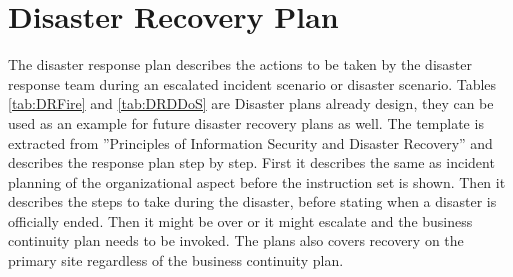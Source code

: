 \section{Disaster Recovery Plan}
The disaster response plan describes the actions to be taken by the disaster response team during an escalated incident scenario or disaster scenario. Tables \ref{tab:DRFire} and \ref{tab:DRDDoS} are Disaster plans already design, they can be used as an example for future disaster recovery plans as well. The template is extracted from ”Principles of Information Security and Disaster Recovery” \cite{whitman6} and describes the response plan step by step. First it describes the same as incident planning of the organizational aspect before the instruction set is shown. Then it describes the steps to take during the disaster, before stating when a disaster is officially ended. Then it might be over or it might escalate and the business continuity plan needs to be invoked. The plans also covers recovery on the primary site regardless of the business continuity plan. 
